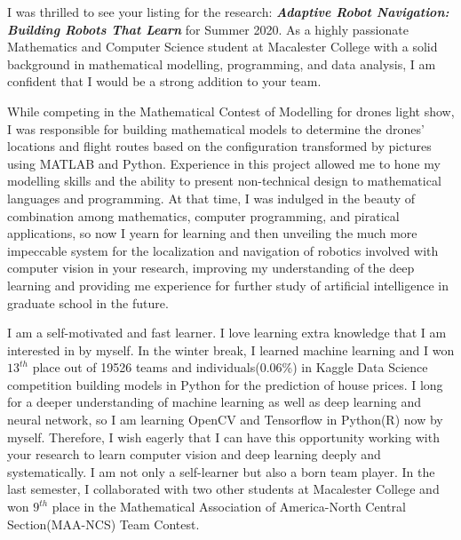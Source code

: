\documentclass[11pt, a4paper]{awesome-cv}
\begin{document}
\makecvheader[L]


\makelettertitle

\begin{cvletter}
I was thrilled to see your listing for the research: \textit{\textbf{Adaptive Robot Navigation: Building Robots That Learn}} for Summer 2020. As a highly passionate Mathematics and Computer Science student at Macalester College with a solid background in mathematical modelling, programming, and data analysis, I am confident that I would be a strong addition to your team.


While competing in the Mathematical Contest of Modelling for drones light show, I was responsible for building mathematical models to determine the drones' locations and flight routes based on the configuration transformed by pictures using MATLAB and Python. Experience in this project allowed me to hone my modelling skills and the ability to present non-technical design to mathematical languages and programming. At that time, I was indulged in the beauty of combination among mathematics, computer programming, and piratical applications, so now I yearn for learning and then unveiling the much more impeccable system for the localization and navigation of robotics involved with computer vision in your research, improving my understanding of the deep learning and providing me experience for further study of artificial intelligence in graduate school in the future. 


I am a self-motivated and fast learner. I love learning extra knowledge that I am interested in by myself. In the winter break, I learned machine learning and I won $13^{th}$ place out of 19526 teams and individuals(0.06\%) in Kaggle Data Science competition building models in Python for the prediction of house prices. I long for a deeper understanding of machine learning as well as deep learning and neural network, so I am learning OpenCV and Tensorflow in Python(R) now by myself. Therefore, I wish eagerly that I can have this opportunity working with your research to learn computer vision and deep learning deeply and systematically. I am not only a self-learner but also a born team player. In the last semester, I collaborated with two other students at Macalester College and won $9^{th}$ place in the Mathematical Association of America-North Central Section(MAA-NCS) Team Contest.






\end{cvletter}
\end{document}
